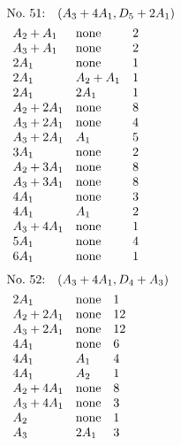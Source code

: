\begin{align*}
&\hbox to 4cm {\textrm{No.~51:}\quad$(A_{3}+4A_{1}, D_{5}+2A_{1})$\hss}\\ 
&\begin{array}{lll}
A_{2}+A_{1} & \none & 2\\
A_{3}+A_{1} & \none & 2\\
2A_{1} & \none & 1\\
2A_{1} & A_{2}+A_{1} & 1\\
2A_{1} & 2A_{1} & 1\\
A_{2}+2A_{1} & \none & 8\\
A_{3}+2A_{1} & \none & 4\\
A_{3}+2A_{1} & A_{1} & 5\\
3A_{1} & \none & 2\\
A_{2}+3A_{1} & \none & 8\\
A_{3}+3A_{1} & \none & 8\\
4A_{1} & \none & 3\\
4A_{1} & A_{1} & 2\\
A_{3}+4A_{1} & \none & 1\\
5A_{1} & \none & 4\\
6A_{1} & \none & 1\\
\end{array}
\end{align*}
%
%
\begin{align*}
&\hbox to 4cm {\textrm{No.~52:}\quad$(A_{3}+4A_{1}, D_{4}+A_{3})$\hss}\\ 
&\begin{array}{lll}
2A_{1} & \none & 1\\
A_{2}+2A_{1} & \none & 12\\
A_{3}+2A_{1} & \none & 12\\
4A_{1} & \none & 6\\
4A_{1} & A_{1} & 4\\
4A_{1} & A_{2} & 1\\
A_{2}+4A_{1} & \none & 8\\
A_{3}+4A_{1} & \none & 3\\
A_{2} & \none & 1\\
A_{3} & 2A_{1} & 3\\
\end{array}
\end{align*}
%
%

